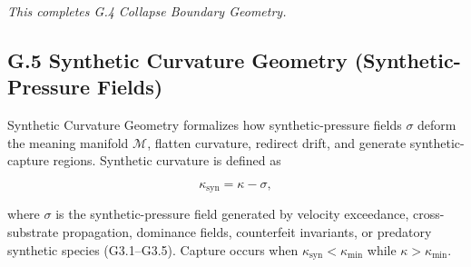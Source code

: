 \medskip

\noindent
\textit{This completes G.4 Collapse Boundary Geometry.}



\subsection*{G.5 Synthetic Curvature Geometry (Synthetic-Pressure Fields)}

\noindent Synthetic Curvature Geometry formalizes how synthetic-pressure fields
$\sigma$ deform the meaning manifold $\mathcal{M}$, flatten curvature, redirect
drift, and generate synthetic-capture regions. Synthetic curvature is defined as


\[
\kappa_{\mathrm{syn}} = \kappa - \sigma,
\]


where $\sigma$ is the synthetic-pressure field generated by velocity exceedance,
cross-substrate propagation, dominance fields, counterfeit invariants, or
predatory synthetic species (G3.1–G3.5). Capture occurs when
$\kappa_{\mathrm{syn}} < \kappa_{\min}$ while $\kappa > \kappa_{\min}$.

